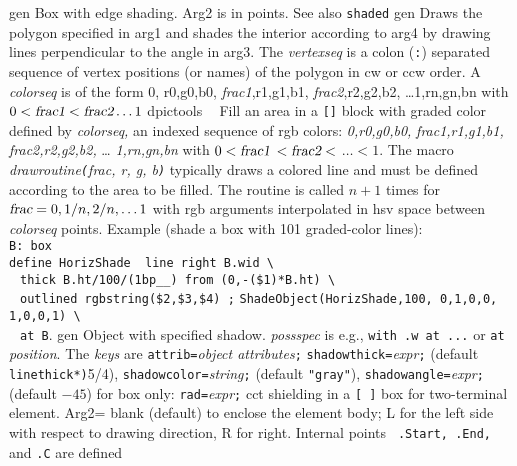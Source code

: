 %
  {gen}%
  {Box with edge shading.  Arg2 is in points. See also {\tt shaded} }%
 {gen}%
  {Draws the polygon specified in arg1 and
  shades the interior according
   to arg4 by drawing lines perpendicular to the angle in arg3.  The {\sl
   vertexseq} is a colon ({\tt:}) separated sequence of vertex positions
   (or names) of the polygon in cw or ccw order. A {\sl colorseq} is of
   the form 0, r0,g0,b0, {\sl frac1},r1,g1,b1, {\sl frac2},r2,g2,b2,
   \ldots 1,rn,gn,bn with $0 < \hbox{\sl frac1} < \hbox{\sl frac2} \ldots 1$ }%
%
  {dpictools}%
  {$\;\;$  Fill an area in a {\tt []} block with graded color
  defined by {\sl colorseq,} an indexed sequence of rgb colors:
    {\sl 0,r0,g0,b0,}%
    {\sl frac1,r1,g1,b1,}%
    {\sl frac2,r2,g2,b2,}%
    \ldots
    {\sl 1,rn,gn,bn}%
  with $0 < \hbox{\sl frac1}$ $< \hbox{\sl frac2} <$ $\ldots < 1.$  The macro
  {\sl drawroutine{\tt(}frac, r, g, b{\tt)}} typically draws a colored line
  and must be defined according to the area to be filled.
  The routine is called $n{+}1$ times for
  $\hbox{\sl frac}= 0, 1/n, 2/n, \ldots 1$ with rgb arguments interpolated
  in hsv space between {\sl colorseq} points.
  Example (shade a box with 101 graded-color lines):\\ 
  {\tt B: box\\
   define HorizShade \lbr\ line right B.wid \textbackslash\\
   $\;$ thick B.ht/100/(1bp\_\_) from (0,-(\$1)*B.ht) \textbackslash\\
   $\;$ outlined rgbstring(\$2,\$3,\$4) \rbr;}%
   {\tt ShadeObject(HorizShade,100, 0,1,0,0, 1,0,0,1) \textbackslash\\
   $\;$ at B}.}%
%
  {gen}%
  { Object with specified shadow.  {\sl possspec} is e.g.,
    {\tt with .w at ...} or {\tt at} {\sl position}.
    The {\sl keys} are
       {\tt attrib=}{\sl object attributes}{\tt ;}%
       {\tt shadowthick=}{\sl expr}{\tt ;} (default {\tt linethick*)}5/4),
       {\tt shadowcolor=}{\sl string}{\tt ;} (default {\tt "gray"}),
       {\tt shadowangle=}{\sl expr}{\tt ;} (default $-45$)
       for box only: {\tt rad=}{\sl expr}{\tt ;}%
 }%
 {cct}%
  {shielding in a {\tt [ ]} box for
  two-terminal element. Arg2= blank
    (default) to enclose the element body; L for the left side with
    respect to drawing direction, R for right. Internal points {\tt
    .Start, .End,} and {\tt .C} are defined}%
